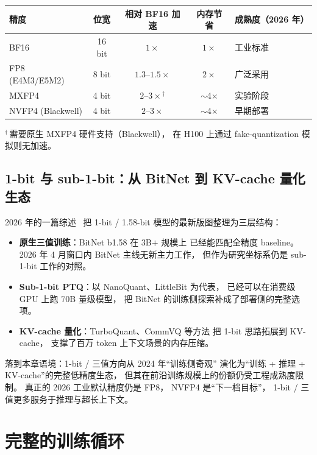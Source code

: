 \begin{center}\small
\renewcommand{\arraystretch}{1.3}
\begin{tabular}{lcccl}
  \toprule
  \rowcolor{figLightGray}
  \textbf{精度} & \textbf{位宽} & \textbf{相对 BF16 加速}
  & \textbf{内存节省} & \textbf{成熟度（2026 年）} \\
  \midrule
  BF16 & 16 bit & $1\times$ & $1\times$ & 工业标准 \\
  FP8 (E4M3/E5M2) & 8 bit & $1.3$--$1.5\times$ & $2\times$ & 广泛采用 \\
  MXFP4 & 4 bit & $2$--$3\times$$^\dagger$ & $\sim$4$\times$ & 实验阶段 \\
  NVFP4 (Blackwell) & 4 bit & $2$--$3\times$ & $\sim$4$\times$ & 早期部署 \\
  \bottomrule
\end{tabular}

\small $^\dagger$\,需要原生 MXFP4 硬件支持（Blackwell），
在 H100 上通过 fake-quantization 模拟则无加速。
\end{center}

\subsection{1-bit 与 sub-1-bit：从 BitNet 到 KV-cache 量化生态}
\label{sec:onebit-survey}

2026 年的一篇综述~\cite{onebit_survey_2026}
把 1-bit / 1.58-bit 模型的最新版图整理为三层结构：
\begin{itemize}[noitemsep]
  \item \textbf{原生三值训练}：BitNet b1.58 在 3B$+$ 规模上
        已经能匹配全精度 baseline。
        2026 年 4 月窗口内 BitNet 主线无新主力工作，
        但作为研究坐标系仍是 sub-1-bit 工作的对照。
  \item \textbf{Sub-1-bit PTQ}：以 NanoQuant、LittleBit 为代表，
        已经可以在消费级 GPU 上跑 70B 量级模型，
        把 BitNet 的训练侧探索补成了部署侧的完整选项。
  \item \textbf{KV-cache 量化}：TurboQuant、CommVQ 等方法
        把 1-bit 思路拓展到 KV-cache，
        支撑了百万 token 上下文场景的内存压缩。
\end{itemize}

落到本章语境：1-bit / 三值方向从 2024 年“训练侧奇观”
演化为“训练 + 推理 + KV-cache”的完整低精度生态，
但其在前沿训练规模上的份额仍受工程成熟度限制。
真正的 2026 工业默认精度仍是 FP8，
NVFP4 是“下一档目标”，
1-bit / 三值更多服务于推理与超长上下文。

\section{完整的训练循环}

